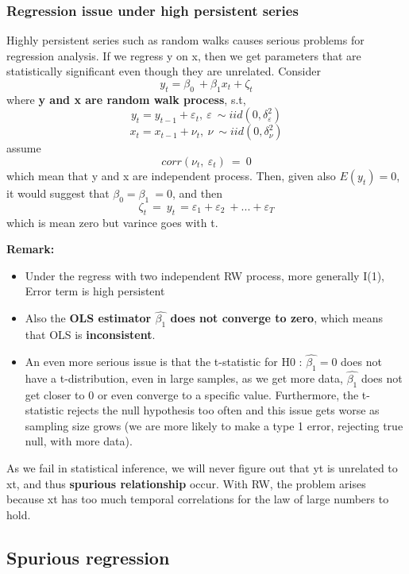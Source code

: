 \documentclass[12pt]{article}
\begin{document}
{\color{RoyalBlue}
\subsubsection{Regression issue under high persistent series}}
Highly persistent series such as random walks causes serious problems for regression analysis. If we regress y on x, then we get parameters that are statistically significant even though they are unrelated. Consider
$$y_t=\beta _0\ +\beta _1x_t+\zeta _t$$
where \textbf{y and x are random walk process}, s.t,
$$y_t=y_{t-1}+\varepsilon _t,\ \varepsilon \ \sim iid\left(0,\delta _{\varepsilon }^2\right)$$
$$x_t=x_{t-1}+\nu _t,\ \nu \ \sim iid\left(0,\delta _{\nu }^2\right)$$
assume 
$$corr\left(\nu _t,\ \varepsilon _t\right)\ =\ 0$$
which mean that y and x are independent process. Then, given also $E(y_t) = 0$, it would suggest that $\beta _0=\beta _1\ =0$, and then 
$$\zeta _t\ =\ y_{t\ }=\varepsilon _1+\varepsilon _2\ +...+\varepsilon _T$$
which is mean zero but varince goes with t. 

\noindent
{\color{ForestGreen}\textbf{Remark: }} 
\begin{itemize}
    \item
    Under the regress with two independent RW process, more generally I(1), Error term is high persistent
    \item
    Also the \textbf{OLS estimator $\hat{\beta_1}$ does not converge to zero}, which means that OLS is \textbf{inconsistent}.
    \item 
    An even more serious issue is that the t-statistic for H0 : $\hat{\beta_1} = 0 $ does not have a t-distribution, even in large samples, as we get more data, $\hat{\beta_1}$ does not get closer to 0 or even converge to a specific value. Furthermore, the t-statistic rejects the null hypothesis too often and this issue gets worse as sampling size grows (we are more likely to make a type 1 error, rejecting true null, with more data).
\end{itemize}

As we fail in statistical inference, we will never figure out that yt is unrelated to xt, and thus \textbf{spurious relationship} occur. With RW, the problem arises because {xt} has too much temporal correlations for the law of large numbers to hold.
\\
{\color{RoyalBlue}
\subsection{Spurious regression}}
\end{document}
